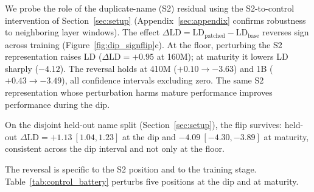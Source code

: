 \documentclass[11pt]{article}
\begin{document}
We probe the role of the duplicate-name (S2) residual using the
S2-to-control intervention of Section~\ref{sec:setup}
(Appendix~\ref{sec:appendix} confirms robustness to neighboring layer windows).
The effect $\Delta\mathrm{LD}=\mathrm{LD}_{\text{patched}}-\mathrm{LD}_{\text{base}}$
reverses sign across training (Figure~\ref{fig:dip_signflip}c). At the floor,
perturbing the S2 representation raises LD ($\Delta\mathrm{LD}=+0.95$ at 160M); at
maturity it lowers LD sharply ($-4.12$). The reversal holds at 410M ($+0.10\to-3.63$) and
1B ($+0.43\to-3.49$), all confidence intervals excluding zero. The same S2 representation whose
perturbation harms mature performance improves performance during the dip.

On the disjoint held-out name split (Section~\ref{sec:setup}), the flip
survives: held-out $\Delta\mathrm{LD}=+1.13\ [1.04,1.23]$ at the dip and
$-4.09\ [-4.30,-3.89]$ at maturity, consistent across the dip interval and not
only at the floor.

The reversal is specific to the S2 position and to the training stage.
Table~\ref{tab:control_battery} perturbs five positions at the dip and at
maturity.
\end{document}
